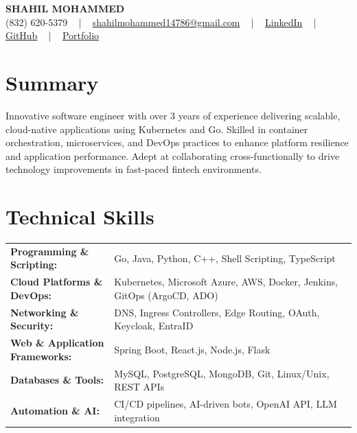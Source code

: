\documentclass[letterpaper,11pt]{article}
\begin{document}
\begin{center}
    {\fontsize{14pt}{12pt}\selectfont \textbf{\MakeUppercase{Shahil Mohammed}}}\\ \vspace{2pt}
    \fontsize{10pt}{12pt}\selectfont (832) 620-5379 ~ | ~ \href{mailto:shahilmohammed14786@gmail.com}{shahilmohammed14786@gmail.com} ~ | ~  
    \href{https://www.linkedin.com/in/shahil-mohammed-9652931a1/}{\color{blue}\underline{LinkedIn}}  ~ | ~ 
    \href{https://github.com/freakbeast14}{\color{blue}\underline{GitHub}} ~ | ~ 
    \href{https://shahil-mohammed.netlify.app/}{\color{blue}\underline{Portfolio}}
    \vspace{-8pt}
\end{center}

\section{Summary}
\fontsize{9pt}{10pt}\selectfont
Innovative software engineer with over 3 years of experience delivering scalable, cloud-native applications using Kubernetes and Go. Skilled in container orchestration, microservices, and DevOps practices to enhance platform resilience and application performance. Adept at collaborating cross-functionally to drive technology improvements in fast-paced fintech environments.
 \vspace{-5pt}
 
\section{Technical Skills}
        \vspace{-14pt}
        \begin{table}[h]
            \fontsize{9pt}{10pt}\selectfont
            \begin{tabular}{p{0.3\linewidth} p{0.7\linewidth}}
                \textbf{Programming \& Scripting:} & Go, Java, Python, C++, Shell Scripting, TypeScript \\
                \textbf{Cloud Platforms \& DevOps:} & Kubernetes, Microsoft Azure, AWS, Docker, Jenkins, GitOps (ArgoCD, ADO) \\
                \textbf{Networking \& Security:} & DNS, Ingress Controllers, Edge Routing, OAuth, Keycloak, EntraID \\
                \textbf{Web \& Application Frameworks:} & Spring Boot, React.js, Node.js, Flask \\
                \textbf{Databases \& Tools:} & MySQL, PostgreSQL, MongoDB, Git, Linux/Unix, REST APIs \\
                \textbf{Automation \& AI:} & CI/CD pipelines, AI-driven bots, OpenAI API, LLM integration \\
            \end{tabular}
        \end{table}
 \vspace{-15pt}
 
\end{document}
